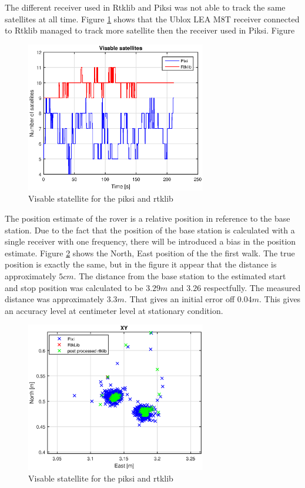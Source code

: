 The different receiver used in Rtklib and Piksi was not able to track the same satellites at all time. Figure \ref{figure:NumSatWalk1} shows that the Ublox LEA M8T receiver connected to Rtklib managed to track more satellite then the receiver used in Piksi.
Figure 
\begin{figure}[H]
	\centering
		\includegraphics[width=0.7\textwidth]{figs/plots/sv.eps}
		\caption{Visable statellite for the piksi and rtklib}
		\label{figure:NumSatWalk1}
\end{figure}
The position estimate of the rover is a relative position in reference to the base station. Due to the fact that the position of the base station is calculated with a single receiver with one frequency, there will be introduced a bias in the position estimate. Figure \ref{figure:enhancedxywalk1} shows the North, East position of the the first walk. The true position is exactly the same, but in the figure it appear that the distance is approximately $5cm$. The distance from the base station to the estimated start and stop position was calculated to be $3.29m$ and $3.26$ respectfully. The measured distance was approximately $3.3m$. That gives an initial error off $0.04m$. This gives an accuracy level at centimeter level at stationary condition. 
\begin{figure}[H]
	\centering
		\includegraphics[width=0.7\textwidth]{figs/plots/enhancedxywalk1.eps}
		\caption{Visable statellite for the piksi and rtklib}
		\label{figure:enhancedxywalk1}
\end{figure}
